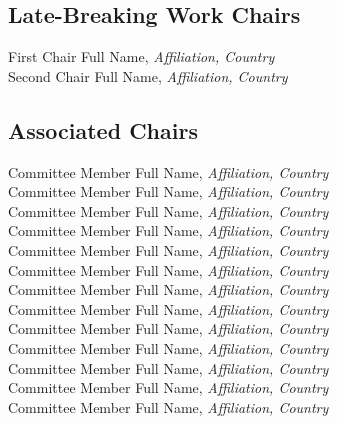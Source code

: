 
\subsection{Late-Breaking Work Chairs}
First Chair Full Name, \emph{Affiliation, Country}\\
Second Chair Full Name, \emph{Affiliation, Country}\\


\subsection{Associated Chairs}
Committee Member Full Name, \emph{Affiliation, Country}\\
Committee Member Full Name, \emph{Affiliation, Country}\\
Committee Member Full Name, \emph{Affiliation, Country}\\
Committee Member Full Name, \emph{Affiliation, Country}\\
Committee Member Full Name, \emph{Affiliation, Country}\\
Committee Member Full Name, \emph{Affiliation, Country}\\
Committee Member Full Name, \emph{Affiliation, Country}\\
Committee Member Full Name, \emph{Affiliation, Country}\\
Committee Member Full Name, \emph{Affiliation, Country}\\
Committee Member Full Name, \emph{Affiliation, Country}\\
Committee Member Full Name, \emph{Affiliation, Country}\\
Committee Member Full Name, \emph{Affiliation, Country}\\
Committee Member Full Name, \emph{Affiliation, Country}\\

